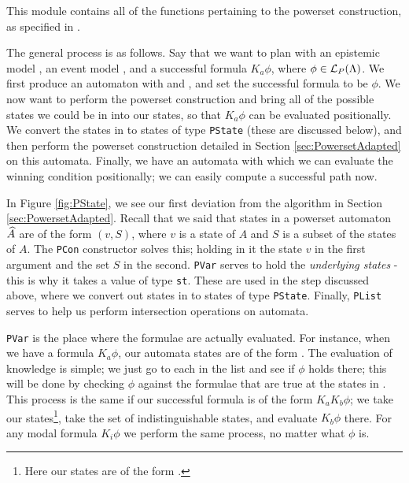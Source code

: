 \documentclass[10pt, a4paper]{report}
\begin{document}
This module contains all of the functions pertaining to the powerset
construction, as specified in .

The general process is as follows. Say that we want to plan with an epistemic
model , an event model , and a successful formula $K_a \phi$,
where $\phi \in \mathcal{L}_P(\Lambda)$. We first produce an \mestar automaton
with  and , and set the successful formula to be $\phi$. We now
want to perform the powerset construction and bring all of the possible states
we could be in into our states, so that $K_a \phi$ can be evaluated
positionally. We convert the states in \mestar to states of type
\texttt{PState} (these are discussed below), and then perform the
powerset construction detailed in Section \ref{sec:PowersetAdapted} on this
automata. Finally, we have an automata with which we can evaluate the winning
condition positionally; we can easily compute a successful path now. 

In Figure \ref{fig:PState}, we see our first deviation from the algorithm in
Section \ref{sec:PowersetAdapted}. Recall that we said that states in a powerset
automaton $\widehat{A}$ are of the form $(v, S)$, where $v$ is a state of $A$ and $S$
is a subset of the states of $A$. The \texttt{PCon} constructor
solves this; holding in it the state $v$ in the first argument and the set $S$
in the second. \texttt{PVar} serves to hold the \emph{underlying
  states} - this is why it takes a value of type \texttt{st}. These
are used in the step discussed above, where we convert out states in \mestar to
states of type \texttt{PState}. Finally,
\texttt{PList} serves to help us perform intersection
operations on automata.

\texttt{PVar} is the place where the formulae are actually
evaluated. For instance, when we have a formula $K_a \phi$, our automata states
are of the form . The evaluation of knowledge is
simple; we just go to each  in the list and see if $\phi$ holds there;
this will be done by checking $\phi$ against the formulae that are true at the
states in . This process is the same if our successful formula is of
the form $K_a K_b \phi$; we take our states\footnote{Here our states are of the
  form .}, take
the set of indistinguishable states, and evaluate $K_b \phi$ there. For any
modal formula $K_i \phi$ we perform the same process, no matter what $\phi$ is.
\end{document}
